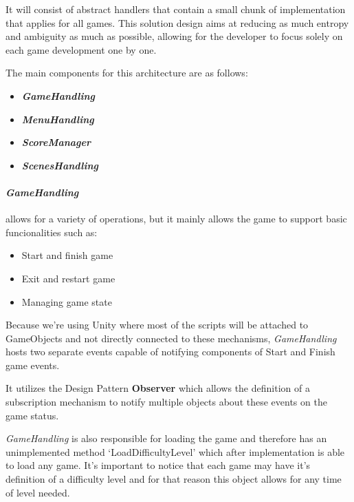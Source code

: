 It will consist of abstract handlers that contain a small chunk of implementation that applies for all games. This solution design aims at reducing as much entropy and ambiguity as much as possible, allowing for the developer to focus solely on each game development one by one.

The main components for this architecture are as follows:
\begin{itemize}
    \item \textbf{\textit{GameHandling}}
    \item  \textbf{\textit{MenuHandling}}
    \item \textbf{\textit{ScoreManager}}
    \item \textbf{\textit{ScenesHandling}}
\end{itemize}



\newpage
\paragraph{\textit{GameHandling}} allows for a variety of operations, but it mainly allows the game to support basic funcionalities such as:
\begin{itemize}
    \item Start and finish game
    \item Exit and restart game
    \item Managing game state
\end{itemize}

Because we're using Unity where most of the scripts will be attached to GameObjects and not directly connected to these mechanisms, \textit{GameHandling} hosts two separate events capable of notifying components of Start and Finish game events.

It utilizes the Design Pattern \textbf{Observer} \cite{observer} which allows the definition of a subscription mechanism to notify multiple objects about these events on the game status.

\textit{GameHandling} is also responsible for loading the game and therefore has an unimplemented method `LoadDifficultyLevel' which after implementation is able to load any game. It's important to notice that each game may have it's definition of a difficulty level and for that reason this object allows for any time of level needed.

